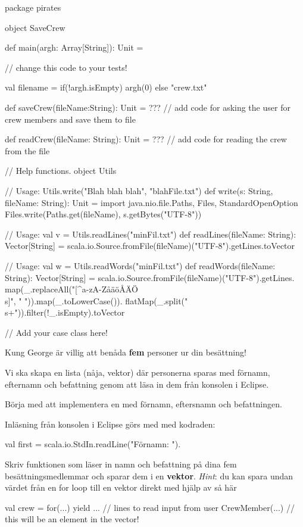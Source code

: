 \begin{CodeSmall}
package pirates

object SaveCrew {
  	def main(argh: Array[String]): Unit = {
  	  	// change this code to your tests!
  	  
		val filename = if(!argh.isEmpty) argh(0) else "crew.txt"
	}
  	
  	def saveCrew(fileName:String): Unit = ??? 
	// add code for asking the user for crew members and save them to file
  	
	 def readCrew(fileName: String): Unit = ??? 
	 // add code for reading the crew from the file
}
// Help functions. 
object Utils{
// Usage: Utils.write("Blah blah blah", "blahFile.txt")
  def write(s: String, fileName: String): Unit = {
			import java.nio.file.{Paths, Files, StandardOpenOption}
			Files.write(Paths.get(fileName), s.getBytes("UTF-8"))
  } 
  
// Usage: val v = Utils.readLines("minFil.txt")
  def readLines(fileName: String): Vector[String] = {
			scala.io.Source.fromFile(fileName)("UTF-8").getLines.toVector
	}		
  

// Usage: val w = Utils.readWords("minFil.txt")
	def readWords(fileName: String): Vector[String] = {
			scala.io.Source.fromFile(fileName)("UTF-8").getLines.
			map(_.replaceAll("[^a-zA-ZåäöÅÄÖ\\s]", " ")).map(_.toLowerCase()).
			flatMap(_.split("\\s+")).filter(!_.isEmpty).toVector
	}
}

// Add your case class here!

\end{CodeSmall}


\Subtask Kung George {\"a}r villig att ben{\aa}da {\bf fem} personer ur din bes{\"a}ttning! 

Vi ska skapa en lista (nåja, vektor) d{\"a}r personerna sparas med f{\"o}rnamn, efternamn och befattning genom att l{\"a}sa in dem fr{\aa}n konsolen i Eclipse. 

Börja med att implementera en  med förnamn, eftersnamn och befattningen.

\Subtask Inl{\"a}sning från konsolen i Eclipse g{\"o}rs med  med kodraden: 
\begin{Code}
val first = scala.io.StdIn.readLine("Förnamn: "). 
\end{Code}

Skriv funktionen  som läser in namn och befattning på dina fem besättningsmedlemmar och sparar dem i en {\bf vektor}. \emph{Hint}: du kan spara undan värdet från en for loop till en vektor direkt med hjälp av  så här 
\begin{CodeSmall} 
val crew = for(...) yield { 
... // lines to read input from user
	CrewMember(...) // this will be an element in the vector!
}
\end{CodeSmall}



